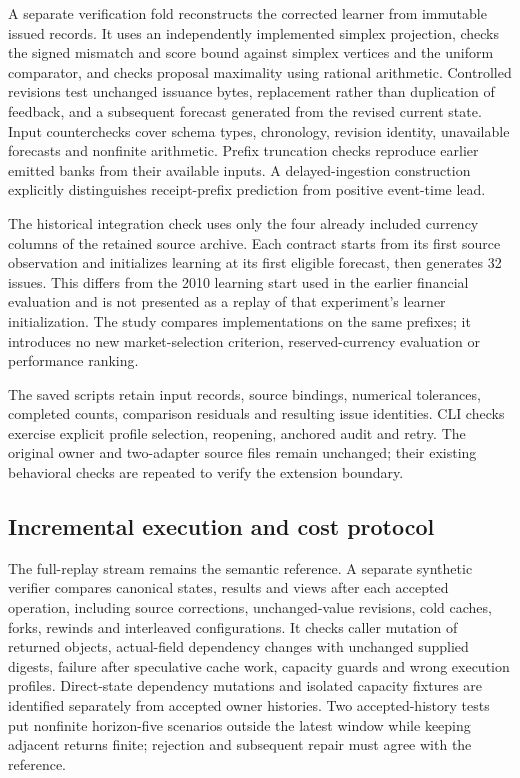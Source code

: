 \documentclass[11pt,a4paper]{article}
\theoremstyle{definition}\newtheorem{definition}[theorem]{Definition}
\begin{document}
A separate verification fold reconstructs the corrected learner from immutable issued records. It uses an independently implemented simplex projection, checks the signed mismatch and score bound against simplex vertices and the uniform comparator, and checks proposal maximality using rational arithmetic. Controlled revisions test unchanged issuance bytes, replacement rather than duplication of feedback, and a subsequent forecast generated from the revised current state. Input counterchecks cover schema types, chronology, revision identity, unavailable forecasts and nonfinite arithmetic. Prefix truncation checks reproduce earlier emitted banks from their available inputs. A delayed-ingestion construction explicitly distinguishes receipt-prefix prediction from positive event-time lead.

The historical integration check uses only the four already included currency columns of the retained source archive. Each contract starts from its first source observation and initializes learning at its first eligible forecast, then generates 32 issues. This differs from the 2010 learning start used in the earlier financial evaluation and is not presented as a replay of that experiment's learner initialization. The study compares implementations on the same prefixes; it introduces no new market-selection criterion, reserved-currency evaluation or performance ranking.

The saved scripts retain input records, source bindings, numerical tolerances, completed counts, comparison residuals and resulting issue identities. CLI checks exercise explicit profile selection, reopening, anchored audit and retry. The original owner and two-adapter source files remain unchanged; their existing behavioral checks are repeated to verify the extension boundary.

\subsection{Incremental execution and cost protocol}\label{sec:incrementalprotocol}
The full-replay stream remains the semantic reference. A separate synthetic verifier compares canonical states, results and views after each accepted operation, including source corrections, unchanged-value revisions, cold caches, forks, rewinds and interleaved configurations. It checks caller mutation of returned objects, actual-field dependency changes with unchanged supplied digests, failure after speculative cache work, capacity guards and wrong execution profiles. Direct-state dependency mutations and isolated capacity fixtures are identified separately from accepted owner histories. Two accepted-history tests put nonfinite horizon-five scenarios outside the latest window while keeping adjacent returns finite; rejection and subsequent repair must agree with the reference.
\end{document}
